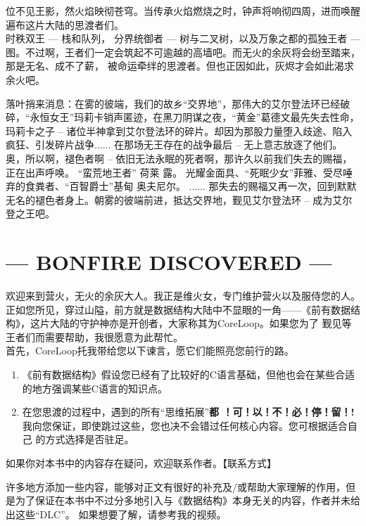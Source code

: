 \documentclass[twoside]{ctexbook}
\begin{document}
位不见王影，然火焰映彻苍穹。当传承火焰燃烧之时，钟声将响彻四周，进而唤醒遍布这片大陆的思渡者们。\\

时秩双王 --- 栈和队列， 分界统御者 --- 树与二叉树，以及万象之都的孤独王者 --- 图。不过啊，王者们一定会筑起不可逾越的高墙吧。而无火的余灰将会纷至踏来，那是无名、成不了薪，
被命运牵绊的思渡者。但也正因如此，灰烬才会如此渴求余火吧。



落叶捎来消息：在雾的彼端，我们的故乡“交界地”，那伟大的艾尔登法环已经破碎，“永恒女王”玛莉卡销声匿迹，在黑刀阴谋之夜，“黄金”葛德文最先失去性命，玛莉卡之子 -- 
诸位半神拿到艾尔登法环的碎片。却因为那股力量堕入歧途、陷入疯狂、引发碎片战争...... 
在那场无王存在的战争最后 -- 无上意志放逐了他们。奥，所以啊，褪色者啊 -- 依旧无法永眠的死者啊，那许久以前我们失去的赐福，正在出声呼唤。
“蛮荒地王者” 荷莱 露。 光耀金面具、“死眠少女”菲雅、受尽唾弃的食粪者、“百智爵士”基甸 奥夫尼尔。
...... 那失去的赐福又再一次，回到默默无名的褪色者身上。朝雾的彼端前进，抵达交界地，觐见艾尔登法环 -- 成为艾尔登之王吧。


\begingroup
\let\cleardoublepage\clearpage
\chapter*{--- BONFIRE DISCOVERED ---}
\endgroup
欢迎来到营火，无火的余灰大人。我正是维火女，专门维护营火以及服侍您的人。\\

正如您所见，穿过山隘，前方就是数据结构大陆中不显眼的一角------《前有数据结构》，这片大陆的守护神亦是开创者，大家称其为CoreLoop。如果您为了
觐见等王者们而需要帮助，我很愿意为此帮忙。\\

首先，CoreLoop托我带给您以下谏言，愿它们能照亮您前行的路。
\begin{enumerate}
    \item 《前有数据结构》假设您已经有了比较好的C语言基础，但他也会在某些合适的地方强调某些C语言的知识点。
    \item 在您思渡的过程中，遇到的所有“思维拓展”\textbf{都 ！可！以！不！必！停！留！!} 我向您保证，即使跳过这些，您也决不会错过任何核心内容。您可根据适合自己
    的方式选择是否驻足。
\end{enumerate}

如果你对本书中的内容存在疑问，欢迎联系作者。【联系方式】

许多地方添加一些内容，能够对正文有很好的补充及/或帮助大家理解的作用，但是为了保证在本书中不过分多地引入与《数据结构》本身无关的内容，作者并未给出这些“DLC”。
如果想要了解，请参考我的视频。
\end{document}
